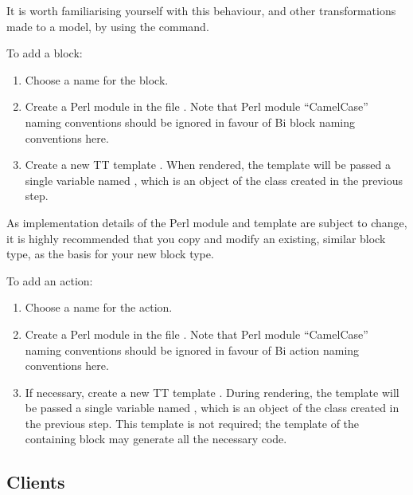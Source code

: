 It is worth familiarising yourself with this behaviour, and other
transformations made to a model, by using the  command.

To add a block:
\begin{enumerate}
\item Choose a name for the block.
\item Create a Perl module  in the
  file . Note that Perl module
  ``CamelCase'' naming conventions should be ignored in favour of Bi block
  naming conventions here.
\item Create a new TT template
  . When rendered, the template
  will be passed a single variable named , which is an object of
  the class created in the previous step.
\end{enumerate}

As implementation details of the Perl module and template are subject to
change, it is highly recommended that you copy and modify an existing, similar
block type, as the basis for your new block type.

To add an action:
\begin{enumerate}
\item Choose a name for the action.
\item Create a Perl module  in the
  file . Note that Perl module
  ``CamelCase'' naming conventions should be ignored in favour of Bi action
  naming conventions here.
\item If necessary, create a new TT template
  . During rendering, the
  template will be passed a single variable named , which is an
  object of the class created in the previous step. This template is not
  required; the template of the containing block may generate all the
  necessary code.
\end{enumerate}

\subsection{Clients}

